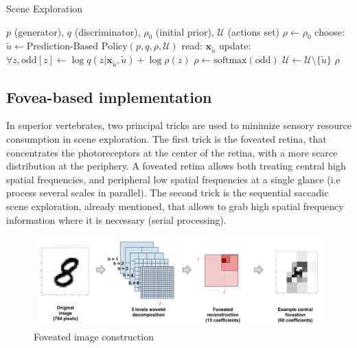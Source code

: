 \documentclass{article} %
\begin{document}
\begin{algorithm}[t]
	\caption{Scene Exploration}\label{algo:saccade}
	\begin{algorithmic}
		\REQUIRE  $p$ (generator), $q$ (discriminator), $\rho_0$ (initial prior), $\mathcal{U}$ (actions set)
		\STATE $\rho \leftarrow \rho_0$ 
		\STATE choose: $\tilde{u} \leftarrow \text{Prediction-Based Policy}(p, q, \rho, \mathcal{U})$
		\STATE read: $\boldsymbol{x}_{\tilde{u}}$
		\STATE update: $\forall z, \text{odd}[z] \leftarrow \log q(z|\boldsymbol{x}_{\tilde{u}},\tilde{u}) + \log \rho(z)$ 
		\STATE $\rho \leftarrow \text{softmax} (\text{odd})$ 
		\STATE $\mathcal{U} \leftarrow \mathcal{U} \setminus \{\tilde{u}\}$ 
		\ENDWHILE
		\RETURN $\rho$
	\end{algorithmic}
\end{algorithm}


\subsection{Fovea-based implementation}

In superior vertebrates, two principal tricks are used to minimize sensory resource consumption in scene exploration. The first trick is the foveated retina, that concentrates the photoreceptors at the center of the retina, with a more scarce distribution at the periphery. A foveated retina allows both treating central high spatial frequencies, and peripheral low spatial frequencies at a single glance (i.e process several scales in parallel). The second trick is the sequential saccadic scene exploration, already mentioned, that allows to grab high spatial frequency information where it is necessary (serial processing). 


\begin{figure}[b!]
	\centerline{
		\includegraphics[width = \linewidth]{img/ICLR-foveated-model.png} 
	}
	\caption{Foveated image construction}\label{fig:foveated}
\end{figure}
\end{document}

